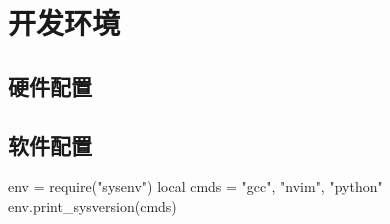 \chapter{开发环境}
\section{硬件配置}

\section{软件配置}
\begin{luacode}
env = require("sysenv")
local cmds = {"gcc", "nvim", "python"}
env.print_sysversion(cmds)
\end{luacode}
